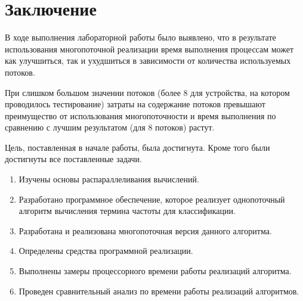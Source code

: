 \chapter*{Заключение}

В ходе выполнения лабораторной работы было выявлено, что в результате использования многопоточной реализации время выполнения процессам может как улучшиться, так и ухудшиться в зависимости от количества используемых потоков.

При слишком большом значении потоков (более 8 для устройства, на котором проводилось тестирование) затраты на содержание потоков превышают преимущество от использования многопоточности и время выполнения по сравнению с лучшим результатом (для 8 потоков) растут.

Цель, поставленная в начале работы, была достигнута. Кроме того были достигнуты все поставленные задачи.
\begin{enumerate}
	\item Изучены основы распараллеливания вычислений.
	\item Разработано программное обеспечение, которое реализует однопоточный алгоритм вычисления термина частоты для классификации.
	\item Разработана и реализована многопоточная версия данного алгоритма.
	\item Определены средства программной реализации.
	\item Выполнены замеры процессорного времени работы реализаций алгоритма.
	\item Проведен сравнительный анализ по времени работы реализаций алгоритмов.
\end{enumerate}
